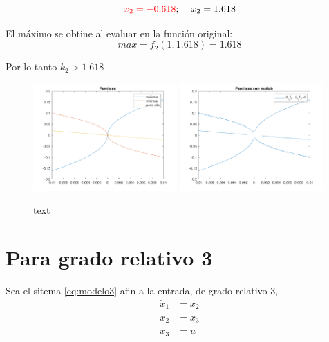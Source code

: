      \begin{equation}
       \textcolor{red}{x_2=-0.618};  \;\;\;\;  x_2=1.618
     \end{equation}


     El máximo se obtine al evaluar en la función original:
     \begin{equation}
       max=f_2(1,1.618)=1.618
     \end{equation}

     Por lo tanto $k_2>1.618$

      \begin{figure}
        \includegraphics[width=0.49\textwidth,]{imagenes/grado2/rayos}
        \includegraphics[width=0.49\textwidth,]{imagenes/grado2/parcialesMatalb.pdf}
        \caption{text}
        \label{text}
      \end{figure}
\section{Para grado relativo 3}
Sea el sitema \ref{eq:modelo3} afin a la entrada, de grado relativo 3, 
\begin{subequations}\label{eq:modelo3}
  \begin{align}\label{eq:modelo1a}
    \dot{x}_1&=x_2 \\
    \dot{x}_2&=x_3 \\
    \dot{x}_3&=u
  \end{align}
\end{subequations}


